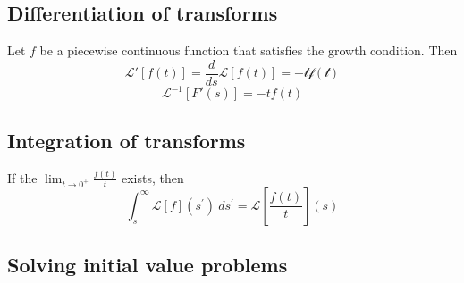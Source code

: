 \subsection{Differentiation of transforms}
Let $f$ be a piecewise continuous function that satisfies the growth condition. Then
\begin{equation*}
    \mathcal{L}'[f(t)] = \frac{d}{ds}\mathcal{L}[f(t)] = -\mathcal{t f(t)}
\end{equation*}
\begin{equation*}
    \mathcal{L}^{-1}[F'(s)] = -tf(t)
\end{equation*}

\subsection{Integration of transforms}
If the $\lim_{t\to 0^+}\frac{f(t)}{t}$ exists, then
\begin{equation*}
    \int_{s}^{\infty}\mathcal{L}[f](s^{\prime})\mathrm{~}ds^{\prime}=\mathcal{L}\left[\frac{f(t)}t\right](s)
\end{equation*}

\subsection{Solving initial value problems}

